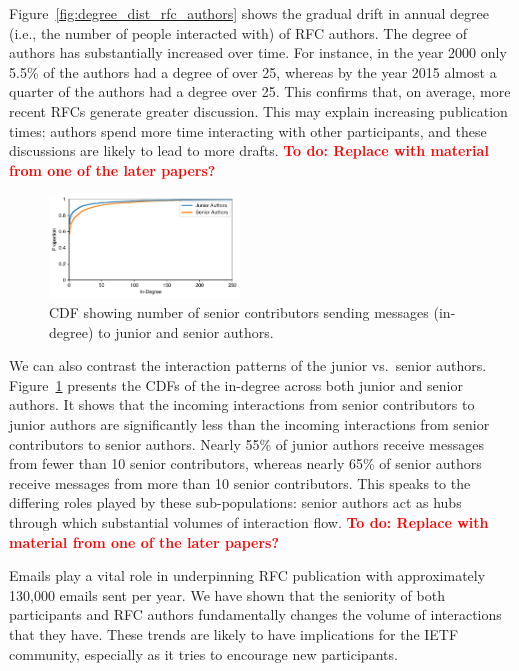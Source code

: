 \documentclass[twocolumn,10pt]{article}
\newcommand{\todo}[1]{\textbf{\textcolor{red}{To do: #1}}}
\newcommand{\pb}[1]{\vspace{0.75ex}\noindent{\textbf{#1}}}
\begin{document}
\pb{Evolution of interactions:}
Figure~\ref{fig:degree_dist_rfc_authors} shows the gradual drift in annual
degree (i.e., the number of people interacted with) of RFC authors. The
degree of authors has substantially increased over time. For instance, in
the year 2000 only 5.5\% of the authors had a degree of over 25, whereas by
the year 2015 almost a quarter of the authors had a degree over 25.  This
confirms that, on average, more recent RFCs generate greater discussion.
This may explain increasing publication times: authors spend more time
interacting with other participants, and these discussions are likely to
lead to more drafts.
\todo{Replace with material from one of the later papers?}

\begin{figure}
\includegraphics[width=0.45\textwidth]{figures-prev/imc-2021/emails/junior_senior_authors_seniormem_indegree.pdf}
\caption{CDF showing number of senior contributors sending messages
  (in-degree) to junior and senior authors.}
\label{fig:junior_senior_indegree_seniormem}
\end{figure}

We can also contrast the interaction patterns of the junior vs.\ senior
authors. Figure~\ref{fig:junior_senior_indegree_seniormem} presents the
CDFs of the in-degree across both junior and senior authors.  It shows that
the incoming interactions from senior contributors to junior authors are
significantly less than the incoming interactions from senior contributors
to senior authors. Nearly 55\% of junior authors receive messages from
fewer than 10 senior contributors, whereas nearly 65\% of senior authors
receive messages from more than 10 senior contributors.  This speaks to the
differing roles played by these sub-populations: senior authors act as hubs
through which substantial volumes of interaction flow.
\todo{Replace with material from one of the later papers?}

\pb{Summary:}
Emails play a vital role in underpinning RFC publication with approximately
130,000 emails sent per year. We have shown that the seniority of both
participants and RFC authors fundamentally changes the volume of
interactions that they have. These trends are likely to have implications
for the IETF community, especially as it tries to encourage new
participants.
\end{document}
